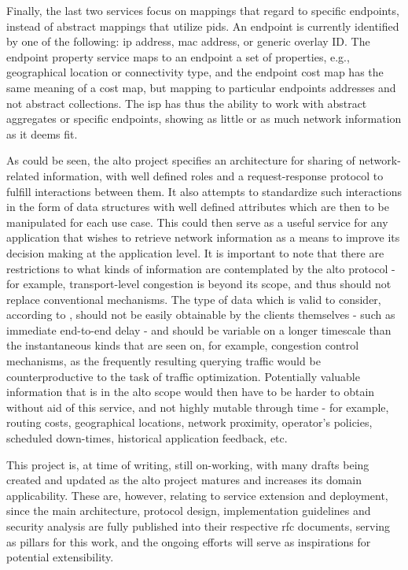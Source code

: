     Finally, the last two services focus on mappings that regard to specific endpoints, instead of abstract mappings that utilize \glspl{pid}.
    An endpoint is currently identified by one of the following: \gls{ip} address, \gls{mac} address, or generic overlay ID.
    The endpoint property service maps to an endpoint a set of properties, e.g., geographical location or connectivity type, and the endpoint cost map has the same meaning of a cost map, but mapping to particular endpoints addresses and not abstract collections.
    The \gls{isp} has thus the ability to work with abstract aggregates or specific endpoints, showing as little or as much network information as it deems fit.

    As could be seen, the \gls{alto} project specifies an architecture for sharing of network-related information, with well defined roles and a request-response protocol to fulfill interactions between them.
    It also attempts to standardize such interactions in the form of data structures with well defined attributes which are then to be manipulated for each use case.
    This could then serve as a useful service for any application that wishes to retrieve network information as a means to improve its decision making at the application level.
    It is important to note that there are restrictions to what kinds of information are contemplated by the \gls{alto} protocol - for example, transport-level congestion is beyond its scope, and thus should not replace conventional mechanisms.
    The type of data which is valid to consider, according to \cite{alto-problem-statement}, should not be easily obtainable by the clients themselves - such as immediate end-to-end delay - and should be variable on a longer timescale than the instantaneous kinds that are seen on, for example, congestion control mechanisms, as the frequently resulting querying traffic would be counterproductive to the task of traffic optimization.
    Potentially valuable information that is in the \gls{alto} scope would then have to be harder to obtain without aid of this service, and not highly mutable through time - for example, routing costs, geographical locations, network proximity, operator's policies, scheduled down-times, historical application feedback, etc.

    This project is, at time of writing, still on-working, with many drafts being created and updated as the \gls{alto} project matures and increases its domain applicability.
    These are, however, relating to service extension and deployment, since the main architecture, protocol design, implementation guidelines and security analysis are fully published into their respective \gls{rfc} documents, serving as pillars for this work, and the ongoing efforts will serve as inspirations for potential extensibility.

